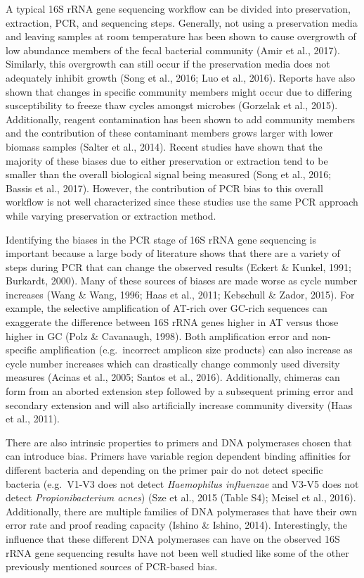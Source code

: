 \documentclass[12pt,]{article}
\begin{document}
A typical 16S rRNA gene sequencing workflow can be divided into
preservation, extraction, PCR, and sequencing steps. Generally, not
using a preservation media and leaving samples at room temperature has
been shown to cause overgrowth of low abundance members of the fecal
bacterial community (Amir et al., 2017). Similarly, this overgrowth can
still occur if the preservation media does not adequately inhibit growth
(Song et al., 2016; Luo et al., 2016). Reports have also shown that
changes in specific community members might occur due to differing
susceptibility to freeze thaw cycles amongst microbes (Gorzelak et al.,
2015). Additionally, reagent contamination has been shown to add
community members and the contribution of these contaminant members
grows larger with lower biomass samples (Salter et al., 2014). Recent
studies have shown that the majority of these biases due to either
preservation or extraction tend to be smaller than the overall
biological signal being measured (Song et al., 2016; Bassis et al.,
2017). However, the contribution of PCR bias to this overall workflow is
not well characterized since these studies use the same PCR approach
while varying preservation or extraction method.

Identifying the biases in the PCR stage of 16S rRNA gene sequencing is
important because a large body of literature shows that there are a
variety of steps during PCR that can change the observed results (Eckert
\& Kunkel, 1991; Burkardt, 2000). Many of these sources of biases are
made worse as cycle number increases (Wang \& Wang, 1996; Haas et al.,
2011; Kebschull \& Zador, 2015). For example, the selective
amplification of AT-rich over GC-rich sequences can exaggerate the
difference between 16S rRNA genes higher in AT versus those higher in GC
(Polz \& Cavanaugh, 1998). Both amplification error and non-specific
amplification (e.g.~incorrect amplicon size products) can also increase
as cycle number increases which can drastically change commonly used
diversity measures (Acinas et al., 2005; Santos et al., 2016).
Additionally, chimeras can form from an aborted extension step followed
by a subsequent priming error and secondary extension and will also
artificially increase community diversity (Haas et al., 2011).

There are also intrinsic properties to primers and DNA polymerases
chosen that can introduce bias. Primers have variable region dependent
binding affinities for different bacteria and depending on the primer
pair do not detect specific bacteria (e.g.~V1-V3 does not detect
\emph{Haemophilus influenzae} and V3-V5 does not detect
\emph{Propionibacterium acnes}) (Sze et al., 2015 (Table S4); Meisel et
al., 2016). Additionally, there are multiple families of DNA polymerases
that have their own error rate and proof reading capacity (Ishino \&
Ishino, 2014). Interestingly, the influence that these different DNA
polymerases can have on the observed 16S rRNA gene sequencing results
have not been well studied like some of the other previously mentioned
sources of PCR-based bias.
\end{document}
